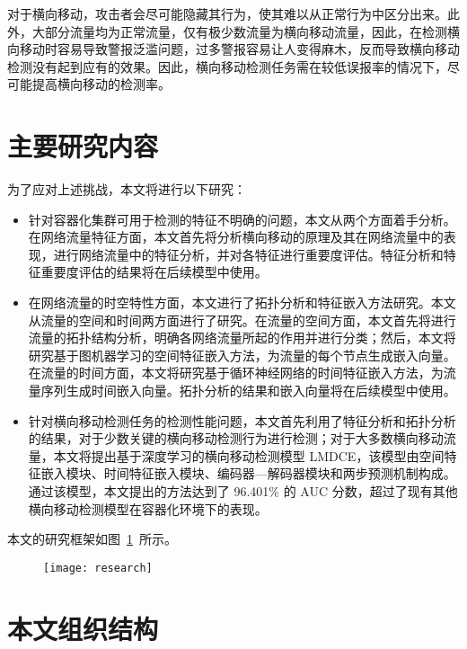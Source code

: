 {\begin{itemize}
{    对于横向移动，攻击者会尽可能隐藏其行为，使其难以从正常行为中区分出来。此外，大部分流量均为正常流量，仅有极少数流量为横向移动流量，因此，在检测横向移动时容易导致警报泛滥问题，过多警报容易让人变得麻木，反而导致横向移动检测没有起到应有的效果。因此，横向移动检测任务需在较低误报率的情况下，尽可能提高横向移动的检测率。
    }
\end{itemize}

\section{主要研究内容}

为了应对上述挑战，本文将进行以下研究：

\begin{itemize}
    \item 针对容器化集群可用于检测的特征不明确的问题，本文从两个方面着手分析。在网络流量特征方面，本文首先将分析横向移动的原理及其在网络流量中的表现，进行网络流量中的特征分析，并对各特征进行重要度评估。特征分析和特征重要度评估的结果将在后续模型中使用。
    \item 在网络流量的时空特性方面，本文进行了拓扑分析和特征嵌入方法研究。本文从流量的空间和时间两方面进行了研究。在流量的空间方面，本文首先将进行流量的拓扑结构分析，明确各网络流量所起的作用并进行分类；然后，本文将研究基于图机器学习的空间特征嵌入方法，为流量的每个节点生成嵌入向量。在流量的时间方面，本文将研究基于循环神经网络的时间特征嵌入方法，为流量序列生成时间嵌入向量。拓扑分析的结果和嵌入向量将在后续模型中使用。
    \item 针对横向移动检测任务的检测性能问题，本文首先利用了特征分析和拓扑分析的结果，对于少数关键的横向移动检测行为进行检测；对于大多数横向移动流量，本文将提出基于深度学习的横向移动检测模型 LMDCE，该模型由空间特征嵌入模块、时间特征嵌入模块、编码器—解码器模块和两步预测机制构成。通过该模型，本文提出的方法达到了 96.401\% 的 AUC 分数，超过了现有其他横向移动检测模型在容器化环境下的表现。
\end{itemize}

本文的研究框架如图~\ref{fig:research}~所示。

\begin{figure}[t]
    \centering
    \texttt{[image: research]}
    \label{fig:research}
\end{figure}

\section{本文组织结构}

}
